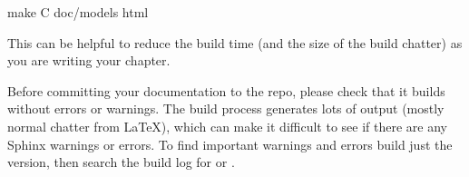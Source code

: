 \documentclass[letterpaper,10pt,english]{sphinxmanual}
\renewcommand{\sphinxcode}[1]{\texttt{\small{#1}}}
\begin{document}
\begin{sphinxVerbatim}[commandchars=\\\{\}]
\PYGZdl{} make \PYGZhy{}C doc/models html
\end{sphinxVerbatim}

This can be helpful to reduce the build time (and the size of the
build chatter) as you are writing your chapter.

Before committing your documentation to the repo, please check
that it builds without errors or warnings.  The build process
generates lots of output (mostly normal chatter from LaTeX),
which can make it difficult to see if there are any Sphinx
warnings or errors.  To find important warnings and errors
build just the \sphinxcode{} version, then search the build log
for \sphinxcode{} or \sphinxcode{}.
\end{document}
